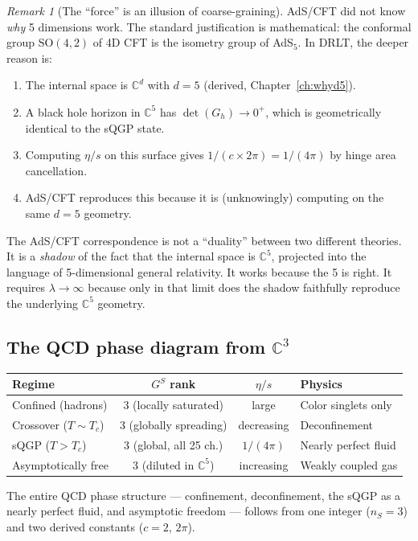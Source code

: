 \documentclass[12pt]{article}
\theoremstyle{remark}
\newtheorem{remark}[theorem]{Remark}
\theoremstyle{definition}
\newcommand{\CC}{\mathbb{C}}
\begin{document}
\begin{remark}[The ``force'' is an illusion of coarse-graining]
AdS/CFT did not know \emph{why} 5 dimensions work. The standard justification is mathematical: the conformal group $\text{SO}(4,2)$ of 4D CFT is the isometry group of AdS$_5$. In DRLT, the deeper reason is:

\begin{enumerate}
\item The internal space is $\CC^d$ with $d = 5$ (derived, Chapter~\ref{ch:whyd5}).
\item A black hole horizon in $\CC^5$ has $\det(G_h) \to 0^+$, which is geometrically identical to the sQGP state.
\item Computing $\eta/s$ on this surface gives $1/(c \times 2\pi) = 1/(4\pi)$ by hinge area cancellation.
\item AdS/CFT reproduces this because it is (unknowingly) computing on the same $d = 5$ geometry.
\end{enumerate}

The AdS/CFT correspondence is not a ``duality'' between two different theories. It is a \emph{shadow} of the fact that the internal space is $\CC^5$, projected into the language of 5-dimensional general relativity. It works because the 5 is right. It requires $\lambda \to \infty$ because only in that limit does the shadow faithfully reproduce the underlying $\CC^5$ geometry.

\subsection{The QCD phase diagram from $\CC^3$}

\begin{center}
\begin{tabular}{lccl}
\hline
Regime & $G^S$ rank & $\eta/s$ & Physics \\
\hline
Confined (hadrons) & 3 (locally saturated) & large & Color singlets only \\
Crossover ($T \sim T_c$) & 3 (globally spreading) & decreasing & Deconfinement \\
sQGP ($T > T_c$) & 3 (global, all 25 ch.) & $1/(4\pi)$ & Nearly perfect fluid \\
Asymptotically free & 3 (diluted in $\CC^5$) & increasing & Weakly coupled gas \\
\hline
\end{tabular}
\end{center}

The entire QCD phase structure --- confinement, deconfinement, the sQGP as a nearly perfect fluid, and asymptotic freedom --- follows from one integer ($n_S = 3$) and two derived constants ($c = 2$, $2\pi$).


\end{remark}
\end{document}
